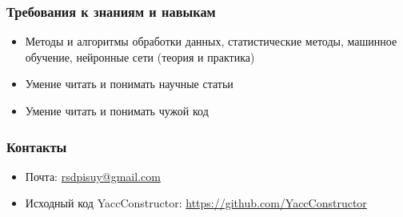 \documentclass{beamer}
\begin{document}
\begin{frame}
  \transwipe[direction=90]
  \frametitle{Требования к знаниям и навыкам}
  \begin{itemize}
    \item Методы и алгоритмы обработки данных, статистические методы, машинное обучение, нейронные сети (теория и практика)
    \item Умение читать и понимать научные статьи
    \item Умение читать и понимать чужой код    
  \end{itemize}
\end{frame}
            
\begin{frame}
\transwipe[direction=90]
\frametitle{Контакты}
\begin{itemize}
  \item Почта: \url{rsdpisuy@gmail.com}
  \item Исходный код YaccConstructor: \url{https://github.com/YaccConstructor}
\end{itemize}
\end{frame}
\end{document}

